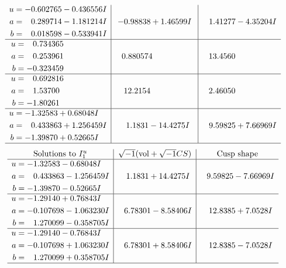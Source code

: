 \documentclass[1p]{elsarticle_modified}
\theoremstyle{definition}
\newcommand{\I}{\sqrt{-1}}
\begin{document}
$$\begin{array}{c|c|c}
\begin{aligned}
u &= -0.602765 - 0.436556 I \\
a &= \phantom{-}0.289714 - 1.181214 I \\
b &= \phantom{-}0.018598 - 0.533941 I\end{aligned}
 & -0.98838 + 1.46599 I & \phantom{-}1.41277 - 4.35204 I \\ \hline\begin{aligned}
u &= \phantom{-}0.734365\phantom{ +0.000000I} \\
a &= \phantom{-}0.253961\phantom{ +0.000000I} \\
b &= -0.323459\phantom{ +0.000000I}\end{aligned}
 & \phantom{-}0.880574\phantom{ +0.000000I} & \phantom{-}13.4560\phantom{ +0.000000I} \\ \hline\begin{aligned}
u &= \phantom{-}0.692816\phantom{ +0.000000I} \\
a &= \phantom{-}1.53700\phantom{ +0.000000I} \\
b &= -1.80261\phantom{ +0.000000I}\end{aligned}
 & \phantom{-}12.2154\phantom{ +0.000000I} & \phantom{-}2.46050\phantom{ +0.000000I} \\ \hline\begin{aligned}
u &= -1.32583 + 0.68048 I \\
a &= \phantom{-}0.433863 + 1.256459 I \\
b &= -1.39870 + 0.52665 I\end{aligned}
 & \phantom{-}1.1831 - 14.4275 I & \phantom{-}9.59825 + 7.66969 I\\
 \hline 
 \end{array}$$\newpage$$\begin{array}{c|c|c}  
\text{Solutions to }I^u_{1}& \I (\text{vol} + \sqrt{-1}CS) & \text{Cusp shape}\\
 \hline 
\begin{aligned}
u &= -1.32583 - 0.68048 I \\
a &= \phantom{-}0.433863 - 1.256459 I \\
b &= -1.39870 - 0.52665 I\end{aligned}
 & \phantom{-}1.1831 + 14.4275 I & \phantom{-}9.59825 - 7.66969 I \\ \hline\begin{aligned}
u &= -1.29140 + 0.76843 I \\
a &= -0.107698 - 1.063230 I \\
b &= \phantom{-}1.270099 - 0.358705 I\end{aligned}
 & \phantom{-}6.78301 - 8.58406 I & \phantom{-}12.8385 + 7.0528 I \\ \hline\begin{aligned}
u &= -1.29140 - 0.76843 I \\
a &= -0.107698 + 1.063230 I \\
b &= \phantom{-}1.270099 + 0.358705 I\end{aligned}
 & \phantom{-}6.78301 + 8.58406 I & \phantom{-}12.8385 - 7.0528 I\\
 \hline 
 \end{array}$$\newpage\newpage\renewcommand{\arraystretch}{1}
\end{document}
